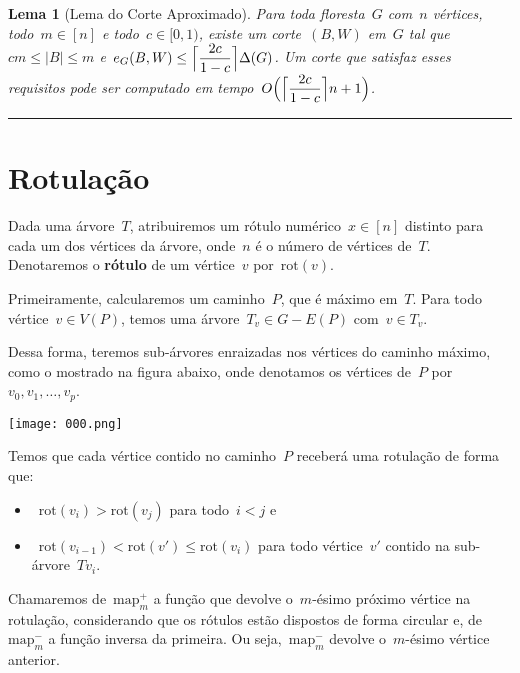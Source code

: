 \documentclass[a0,portrait]{a0poster}
\DeclarePairedDelimiter\ceil{\lceil}{\rceil}
\newtheorem{lem}{Lema}
\newcommand{\rot}{\mathrm{rot}}
\newcommand{\map}{\mathrm{map}}
\begin{document}
\begin{multicols}{3}
\medskip

\begin{lem}[Lema do Corte Aproximado]
    Para toda floresta~$G$ com~$n$ vértices, todo~${m \in [n]}$ e 
    todo~${c \in [0,1)}$, existe um corte~$(B,W)$ em~$G$ tal 
    que~${cm \le |B| \le m}$ 
    e~${e_G(B,W) \le \ceil[\Big]{ \dfrac{2c}{1-c}} \Delta(G)}$.
    Um corte que satisfaz esses requisitos pode ser computado em
    tempo~$O{\Big(\ceil[\Big]{ \dfrac{2c}{1-c}} n+1\Big)}$.
\end{lem}

\noindent\rule[0.5ex]{\linewidth}{1pt}



\section*{Rotulação}

    Dada uma árvore~$T$, atribuiremos um 
    rótulo numérico~${x\in [n]}$ distinto para cada um dos vértices 
    da árvore, onde~$n$ é o número de vértices de~$T$. 
    Denotaremos o \textbf{rótulo} de um vértice~$v$ por~$\rot(v)$.

    Primeiramente, calcularemos 
    um caminho~$P$, que é máximo em~$T$. 
    Para todo vértice~${v\in V(P)}$, temos uma 
    árvore~${T_v \in G - E(P)}$ com~$v\in T_v$.

    Dessa forma, teremos sub-árvores enraizadas nos vértices do
    caminho máximo, como o mostrado na figura abaixo, onde denotamos
    os vértices de~$P$ por~${v_0,v_1,\ldots,v_p}$.
    
\begin{center}
\texttt{[image: 000.png]}
\end{center}

    Temos que cada vértice contido no caminho~$P$ receberá 
    uma rotulação de forma que:
    \begin{itemize}
        \item~${\rot(v_i)>\rot(v_j)}$ para todo~${i<j}$ e
        \item~${\rot(v_{i-1})<\rot(v') \le \rot(v_i)}$ para todo 
        vértice~$v'$ contido na sub-árvore~$T{v_i}$. 
    \end{itemize}
    
    Chamaremos de~${\map^+_m}$ a função que devolve o~$m$-ésimo 
    próximo vértice na rotulação, considerando que os rótulos
    estão dispostos de forma circular
    e, de~${\map^-_m}$ a função inversa da primeira. 
    Ou seja,~${\map^-_m}$ devolve o~$m$-ésimo vértice anterior.


\end{multicols}
\end{document}
